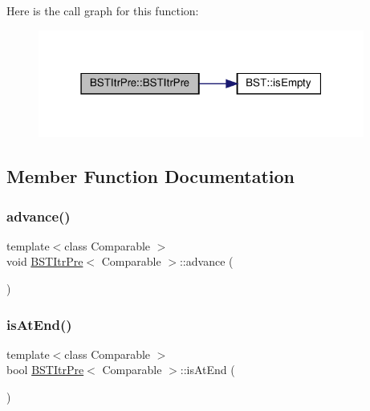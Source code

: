 Here is the call graph for this function\+:\nopagebreak
\begin{figure}[H]
\begin{center}
\leavevmode
\includegraphics[width=304pt]{classBSTItrPre_a11b1cd4e783f153b9c1b64ce2ec8077e_cgraph}
\end{center}
\end{figure}


\subsection{Member Function Documentation}
\mbox{\label{classBSTItrPre_a7a743d66a842018fd833fb2b0737254d}} 
\subsubsection{\texorpdfstring{advance()}{advance()}}
{\footnotesize\ttfamily template$<$class Comparable $>$ \\
void \hyperlink{classBSTItrPre}{B\+S\+T\+Itr\+Pre}$<$ Comparable $>$\+::advance (\begin{DoxyParamCaption}{ }\end{DoxyParamCaption})}

\mbox{\label{classBSTItrPre_ae282a7b9ffa9d250bb0f6a6d79f6e8d0}} 
\subsubsection{\texorpdfstring{is\+At\+End()}{isAtEnd()}}
{\footnotesize\ttfamily template$<$class Comparable $>$ \\
bool \hyperlink{classBSTItrPre}{B\+S\+T\+Itr\+Pre}$<$ Comparable $>$\+::is\+At\+End (\begin{DoxyParamCaption}{ }\end{DoxyParamCaption})\hspace{0.3cm}{\ttfamily [inline]}}

